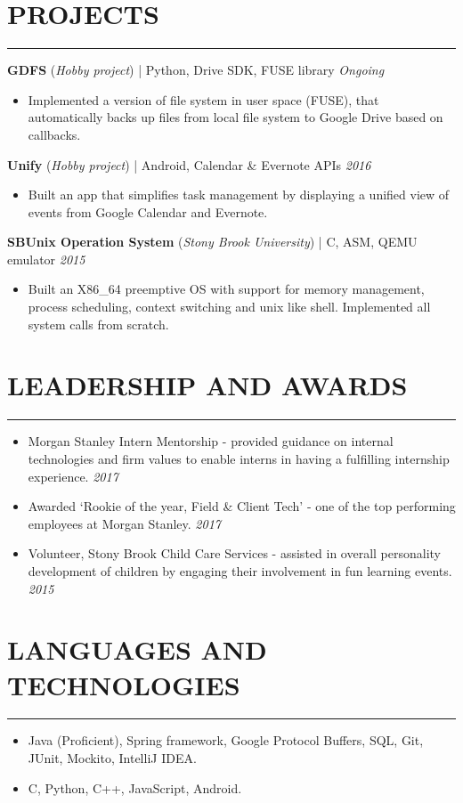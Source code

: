 \documentclass[12pt]{article}
\newcommand{\sectionHeading}[1]{
\section*{\small{#1}}
\vspace{-10pt}
\hrule
\vspace{8pt}
}
\newcommand {\projectSectionSubheading}[4]{
    \noindent \small{\textbf{#1} (\textit{#2}) | #3 \hfill \textit{#4}} \\
    \vspace{-20pt}
}
\newcommand{\sectionListStart}{
    \begin{itemize}[label={\small{\textbullet}}, leftmargin=20pt] %
}
\newcommand{\sectionListEnd}{\end{itemize}}
\newcommand{\sectionListItem}[1]{\item \small{#1}}
\newcommand{\sectionListItemWithDate}[2]{\item \small{#1 \hfill \textit{#2}} \\\vspace{-10pt}}
\begin{document}
\sectionHeading{PROJECTS}
\projectSectionSubheading{GDFS}{Hobby project}{Python, Drive SDK, FUSE library}{Ongoing}
\sectionListStart
    \sectionListItem
        Implemented a version of file system in user space (FUSE), that automatically backs up files from local file system to Google Drive based on callbacks. 
\sectionListEnd

\projectSectionSubheading{Unify}{Hobby project}{Android, Calendar \& Evernote APIs}{2016}
\sectionListStart
    \sectionListItem
        Built an app that simplifies task management by displaying a unified view of events from Google Calendar and Evernote.
\sectionListEnd

\projectSectionSubheading{SBUnix Operation System}{Stony Brook University}{C, ASM, QEMU emulator}{2015}
\sectionListStart
    \sectionListItem
        Built an X86\_64 preemptive OS with support for memory management, process scheduling, context switching and unix like shell. Implemented all system calls from scratch. 
        

\sectionListEnd

\sectionHeading{LEADERSHIP AND AWARDS}
\sectionListStart
    \sectionListItemWithDate
        {Morgan Stanley Intern Mentorship - provided guidance on internal technologies and firm values to enable interns in having a fulfilling internship experience.}{2017} 
    \sectionListItemWithDate
        {Awarded `Rookie of the year, Field \& Client Tech' - one of the top performing employees at Morgan Stanley.}{2017}
    \sectionListItemWithDate
        {Volunteer, Stony Brook Child Care Services - assisted in overall personality development of children by engaging their involvement in fun learning events.}{2015}
\sectionListEnd

\sectionHeading{LANGUAGES AND TECHNOLOGIES}
\sectionListStart
    \sectionListItem
        Java (Proficient), Spring framework, Google Protocol Buffers, SQL, Git, JUnit, Mockito, IntelliJ IDEA.
    \sectionListItem
        C, Python, C++, JavaScript, Android. 
\sectionListEnd

\end{document}
